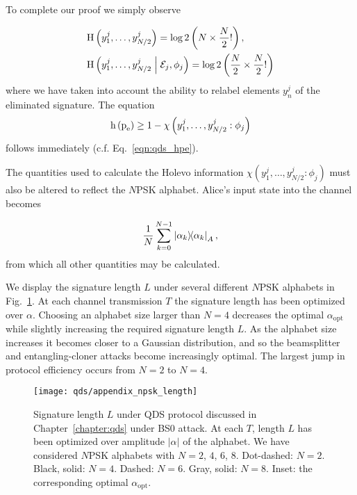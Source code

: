 \noindent To complete our proof we simply observe

\begin{align}
&\text{H}\left(y_1^j, \dots, y_{N/2}^j \right) = \log2 \left( N \times \frac{N}{2}!\right), \notag \\
%
&\text{H}\left(y_1^j, \dots, y_{N/2}^j \given \mathcal{E}_j, \phi_j\right) = \log2 \left( \frac{N}{2} \times \frac{N}{2}!\right)
\end{align}
where we have taken into account the ability to relabel elements $y_n^j$ of the eliminated signature. The equation
\begin{equation}
\text{h}\left(\text{p}_{\text{e}}\right) \ge 1 - \chi\left(y_1^j, \dots, y_{N/2}^j : \phi_j\right)
\end{equation} 
follows immediately (c.f. Eq.~\ref{eqn:qds_hpe}).

The quantities used to calculate the Holevo information $\chi\left(y_1^j, \dots, y_{N/2}^j : \phi_j\right)$ must also be altered to reflect the $N$PSK alphabet. Alice's input state into the channel becomes

\begin{equation}
\frac{1}{N} \sum_{k=0}^{N-1} \dyad{\alpha_k}_A,
\end{equation}
from which all other quantities may be calculated.

We display the signature length $L$ under several different $N$PSK alphabets in Fig.~\ref{fig:appendix_npsk_length}. At each channel transmission $T$ the signature length has been optimized over $\alpha$. Choosing an alphabet size larger than $N=4$ decreases the optimal $\alpha_{\text{opt}}$ while slightly increasing the required signature length $L$. As the alphabet size increases it becomes closer to a Gaussian distribution, and so the beamsplitter and entangling-cloner attacks become increasingly optimal. The largest jump in protocol efficiency occurs from $N=2$ to $N=4$.

\begin{figure}[htp]
\captionsetup{width=0.8\linewidth}
\centering
\texttt{[image: qds/appendix\_npsk\_length]}
\caption{\label{fig:appendix_npsk_length} Signature length $L$ under QDS protocol discussed in Chapter~\ref{chapter:qds} under BS$0$ attack. At each $T$, length $L$ has been optimized over amplitude $\left|\alpha\right|$ of the alphabet. We have considered $N$PSK alphabets with $N = 2$, $4$, $6$, $8$. Dot-dashed: $N=2$. Black, solid: $N = 4$. Dashed: $N = 6$. Gray, solid: $N = 8$. Inset: the corresponding optimal $\alpha_{\text{opt}}$. } %
\end{figure}




